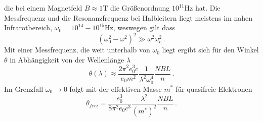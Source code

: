die bei einem Magnetfeld $B \approx 1 \si{\tesla}$ die Größenordnung $10^{11} \si{\hertz}$ hat. Die Messfrequenz und die
Resonanzfrequenz bei Halbleitern liegt meistens im nahen Infrarotbereich, $\omega_0 = 10^{14} - 10^{15} \si{\hertz}$, 
weswegen gilt dass
\begin{equation*}
    \left(\omega_0^2 - \omega^2\right) ^2 \gg \omega^2 \omega_c^2 \, .
\end{equation*} 
Mit einer Messfrequenz, die weit unterhalb von $\omega_0$ liegt ergibt sich für den Winkel $\theta$ in Abhängigkeit von
der Wellenlänge $\lambda$
\begin{equation}
    \label{eq:Winkel2}
    \theta \left(\lambda\right) \approx \frac{2 \pi^2 e_0^3 c}{e_0 m^2} \frac{1}{\lambda^2 \omega_0^4} \frac{N B L}{n} \, .
\end{equation}
Im Grenzfall $\omega_0 \rightarrow 0$ folgt mit der effektiven Masse $m^{*}$ für quasifreie Elektronen
\begin{equation}
    \label{eq:Winkel}
    \theta_\textit{frei} = \frac{e_0^3}{8 \pi^2 e_0 c^3} \frac{\lambda^2}{\left(m^{*}\right)^2} \frac{N B L}{n} \, .
\end{equation}

